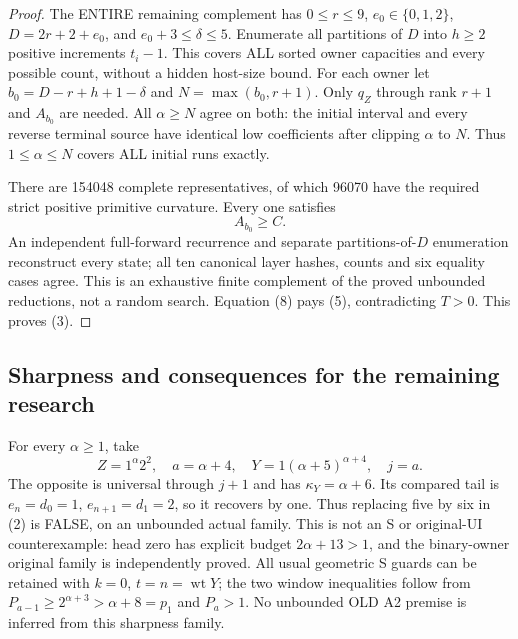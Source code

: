 \begin{proof}
The ENTIRE remaining complement has $0\le r\le9$,
$e_0\in\{0,1,2\}$, $D=2r+2+e_0$, and
$e_0+3\le\delta\le5$.
Enumerate all partitions of $D$ into $h\ge2$ positive increments
$t_i-1$. This covers ALL sorted owner capacities and every possible
count, without a hidden host-size bound.
For each owner let $b_0=D-r+h+1-\delta$ and
$N=\max(b_0,r+1)$. Only $q_Z$ through rank $r+1$ and $A_{b_0}$
are needed. All $\alpha\ge N$ agree on both: the initial interval
and every reverse terminal source have identical low coefficients
after clipping $\alpha$ to $N$. Thus $1\le\alpha\le N$ covers
ALL initial runs exactly.

There are 154048 complete representatives, of which 96070 have
the required strict positive primitive curvature. Every one satisfies
\[
                           A_{b_0}\ge C.              \tag{8}
\]
An independent full-forward recurrence and separate partitions-of-$D$
enumeration reconstruct every state; all ten canonical layer hashes,
counts and six equality cases agree. This is an exhaustive finite
complement of the proved unbounded reductions, not a random search.
Equation (8) pays (5), contradicting $T>0$. This proves (3).
\end{proof}

\subsection{Sharpness and consequences for the remaining research}
For every $\alpha\ge1$, take
\[
 Z=1^\alpha2^2,\quad a=\alpha+4,\quad
 Y=1(\alpha+5)^{\alpha+4},\quad j=a.
\]
The opposite is universal through $j+1$ and has
$\kappa_Y=\alpha+6$. Its compared tail is
$e_n=d_0=1$, $e_{n+1}=d_1=2$, so it recovers by one.
Thus replacing five by six in (2) is FALSE, on an unbounded
actual family. This is not an S or original-UI counterexample:
head zero has explicit budget $2\alpha+13>1$, and the binary-owner
original family is independently proved. All usual geometric S
guards can be retained with $k=0$, $t=n=\operatorname{wt}Y$;
the two window inequalities follow from
$P_{a-1}\ge2^{\alpha+3}>\alpha+8=p_1$ and $P_a>1$.
No unbounded OLD A2 premise is inferred from this sharpness family.

